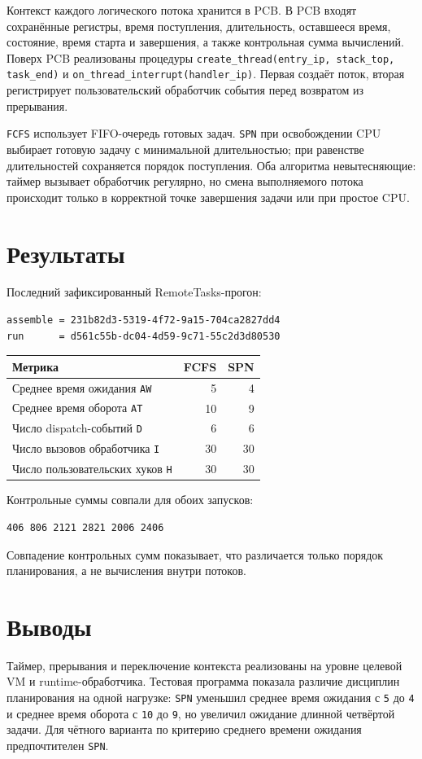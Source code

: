 \documentclass[a4paper,12pt]{article}
\begin{document}
Контекст каждого логического потока хранится в PCB. В PCB входят сохранённые регистры, время поступления, длительность, оставшееся время, состояние, время старта и завершения, а также контрольная сумма вычислений. Поверх PCB реализованы процедуры \texttt{create\_thread(entry\_ip, stack\_top, task\_end)} и \texttt{on\_thread\_interrupt(handler\_ip)}. Первая создаёт поток, вторая регистрирует пользовательский обработчик события перед возвратом из прерывания.

\texttt{FCFS} использует FIFO-очередь готовых задач. \texttt{SPN} при освобождении CPU выбирает готовую задачу с минимальной длительностью; при равенстве длительностей сохраняется порядок поступления. Оба алгоритма невытесняющие: таймер вызывает обработчик регулярно, но смена выполняемого потока происходит только в корректной точке завершения задачи или при простое CPU.

\section{Результаты}
Последний зафиксированный RemoteTasks-прогон:
\begin{lstlisting}
assemble = 231b82d3-5319-4f72-9a15-704ca2827dd4
run      = d561c55b-dc04-4d59-9c71-55c2d3d80530
\end{lstlisting}

\begin{center}
\begin{tabular}{|l|r|r|}
\hline
Метрика & FCFS & SPN \\
\hline
Среднее время ожидания \texttt{AW} & 5 & 4 \\
Среднее время оборота \texttt{AT} & 10 & 9 \\
Число dispatch-событий \texttt{D} & 6 & 6 \\
Число вызовов обработчика \texttt{I} & 30 & 30 \\
Число пользовательских хуков \texttt{H} & 30 & 30 \\
\hline
\end{tabular}
\end{center}

Контрольные суммы совпали для обоих запусков:
\begin{lstlisting}
406 806 2121 2821 2006 2406
\end{lstlisting}

Совпадение контрольных сумм показывает, что различается только порядок планирования, а не вычисления внутри потоков.

\section{Выводы}
Таймер, прерывания и переключение контекста реализованы на уровне целевой VM и runtime-обработчика. Тестовая программа показала различие дисциплин планирования на одной нагрузке: \texttt{SPN} уменьшил среднее время ожидания с \texttt{5} до \texttt{4} и среднее время оборота с \texttt{10} до \texttt{9}, но увеличил ожидание длинной четвёртой задачи. Для чётного варианта по критерию среднего времени ожидания предпочтителен \texttt{SPN}.
\end{document}
